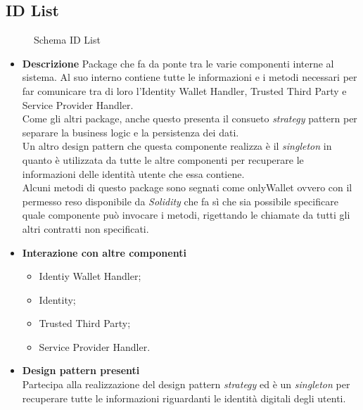 \subsection{ID List}
\begin{figure}[!h]
	\centering
	\caption{Schema ID List}
\end{figure}
\begin{itemize}
	\item \textbf{Descrizione}
	Package che fa da ponte tra le varie componenti interne al sistema. 
	Al suo interno contiene tutte le informazioni e i metodi necessari per far comunicare tra di loro l'Identity Wallet Handler, Trusted Third Party e Service Provider Handler.\\
	Come gli altri package, anche questo presenta il consueto \textit{strategy} pattern per separare la business logic e la persistenza dei dati.\\
	Un altro design pattern che questa componente realizza è il \textit{singleton} in quanto è utilizzata da tutte le altre componenti per recuperare le informazioni delle identità utente che essa contiene.\\
	Alcuni metodi di questo package sono segnati come onlyWallet ovvero con il permesso reso disponibile da \textit{Solidity} che fa sì che sia possibile specificare quale componente può invocare i metodi, rigettando le chiamate da tutti gli altri contratti non specificati.
	\item \textbf{Interazione con altre componenti}
	\begin{itemize}
		\item Identiy Wallet Handler;
		\item Identity;
		\item Trusted Third Party;
		\item Service Provider Handler.
	\end{itemize}
	\item \textbf{Design pattern presenti}\\
	Partecipa alla realizzazione del design pattern \textit{strategy} ed è un \textit{singleton} per recuperare tutte le informazioni riguardanti le identità digitali degli utenti.
\end{itemize}
